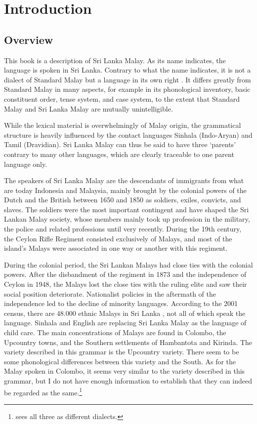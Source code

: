  \chapter{Introduction}
\section{Overview}
This book is a description of Sri Lanka Malay. As its name indicates, the language is spoken in Sri Lanka. Contrary to what the name indicates, it is not a dialect of Standard Malay but a language in its own right \citep{Adelaar1991}. It differs greatly from Standard Malay in many aspects, for example in its phonological inventory, basic constituent order, tense system, and case system, to the extent that Standard Malay and Sri Lanka Malay are  mutually unintelligible.

While the lexical material is overwhelmingly of Malay origin, the grammatical structure is heavily influenced by the contact languages Sinhala (Indo-Aryan) and Tamil (Dravidian). Sri Lanka Malay can thus be said to have three `parents' contrary to many other languages, which are clearly traceable to one parent language only.

The speakers of Sri Lanka Malay are the descendants of immigrants from what are today Indonesia and Malaysia, mainly brought by the colonial powers of the Dutch and the British between 1650 and 1850 as soldiers, exiles, convicts, and slaves. The soldiers were the most important contingent and have shaped the Sri Lankan Malay society, whose members mainly took up profession in the military, the police and related professions until very recently. During the 19th century, the Ceylon Rifle Regiment consisted exclusively of Malays, and most of the island's Malays were associated in one way or another with this regiment.

During the colonial period, the Sri Lankan Malays had close ties with the colonial powers. After the disbandment of the regiment in 1873 and the independence of Ceylon in 1948, the Malays lost the close ties with the ruling elite and saw their social position deteriorate. Nationalist policies in the aftermath of the independence led to the decline of minority languages. According to the 2001 census, there are 48.000 ethnic Malays in Sri Lanka \citep{SmithEtAl2006cll},  not all of which speak the language. Sinhala and English are replacing Sri Lanka Malay as the language of child care. The main concentrations of Malays are found in Colombo, the Upcountry towns, and the Southern settlements of Hambantota and Kirinda. The variety described in this grammar is the Upcountry variety. There seem to be some phonological differences between this variety and the South. As for the Malay spoken in Colombo, it seems very similar to the variety described in this grammar, but I do not have enough information to establish that they can indeed be regarded as the same.\footnote{\citet[34]{Saldin2001} sees all three as different dialects.}

